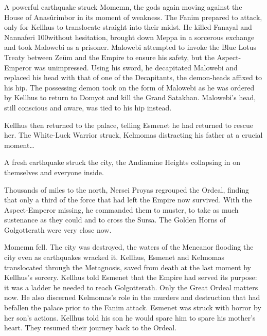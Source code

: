 \documentclass[]{book}
\begin{document}
A powerful earthquake struck Momemn, the gods again moving against the House of
Anasûrimbor in its moment of weakness. The Fanim prepared to attack, only for
Kellhus to translocate straight into their midst. He killed Fanayal and Nannaferi
100without hesitation, brought down Meppa in a sorcerous exchange and took Malowebi
as a prisoner. Malowebi attempted to invoke the Blue Lotus Treaty between Zeüm and
the Empire to ensure his safety, but the Aspect-Emperor was unimpressed. Using his
sword, he decapitated Malowebi and replaced his head with that of one of the
Decapitants, the demon-heads affixed to his hip. The possessing demon took on the
form of Malowebi as he was ordered by Kellhus to return to Domyot and kill the Grand
Satakhan. Malowebi's head, still conscious and aware, was tied to his hip instead.

Kellhus then returned to the palace, telling Esmenet he had returned to rescue her. The
White-Luck Warrior struck, Kelmomas distracting his father at a crucial moment\ldots{}

A fresh earthquake struck the city, the Andiamine Heights collapsing in on themselves
and everyone inside.

Thousands of miles to the north, Nersei Proyas regrouped the Ordeal, finding that only
a third of the force that had left the Empire now survived. With the Aspect-Emperor
missing, he commanded them to muster, to take as much sustenance as they could and
to cross the Sursa. The Golden Horns of Golgotterath were very close now.

Momemn fell. The city was destroyed, the waters of the Meneanor flooding the city
even as earthquakes wracked it. Kellhus, Esmenet and Kelmomas translocated through
the Metagnosis, saved from death at the last moment by Kellhus's sorcery. Kellhus told
Esmenet that the Empire had served its purpose: it was a ladder he needed to reach
Golgotterath. Only the Great Ordeal matters now. He also discerned Kelmomas's role
in the murders and destruction that had befallen the palace prior to the Fanim attack.
Esmenet was struck with horror by her son's actions. Kellhus told his son he would
spare him to spare his mother's heart. They resumed their journey back to the Ordeal.
\end{document}
